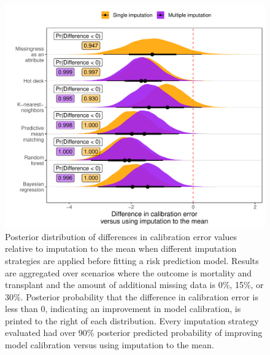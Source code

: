 \documentclass{article}
\begin{document}
\begin{figure}

{\centering \includegraphics{doc_arxiv_files/figure-latex/fig_md_strat_infer_cal_error-1} 

}

\caption{Posterior distribution of differences in calibration error values relative to imputation to the mean when different imputation strategies are applied before fitting a risk prediction model. Results are aggregated over scenarios where the outcome is mortality and transplant and the amount of additional missing data is 0\%, 15\%, or 30\%. Posterior probability that the difference in calibration error is less than 0, indicating an improvement in model calibration, is printed to the right of each distribution. Every imputation strategy evaluated had over 90\% posterior predicted probability of improving model calibration versus using imputation to the mean.}\label{fig:fig_md_strat_infer_cal_error}
\end{figure}

\clearpage



\end{document}
